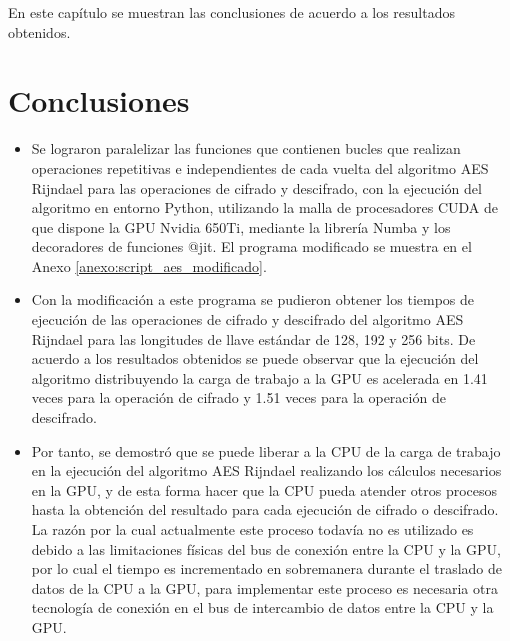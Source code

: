 \documentclass[../main/main.tex]{subfiles}
\begin{document}
\espacio
  En este capítulo se muestran las conclusiones de acuerdo a los resultados obtenidos.

  \section{Conclusiones}

  \begin{itemize}[noitemsep,nolistsep]
    \item Se lograron paralelizar las funciones que contienen bucles que realizan operaciones repetitivas e independientes de cada vuelta del algoritmo AES Rijndael para las operaciones de cifrado y descifrado, con la ejecución del algoritmo en entorno Python, utilizando la malla de procesadores CUDA de que dispone la GPU Nvidia 650Ti, mediante la librería Numba y los decoradores de funciones @jit. El programa modificado se muestra en el Anexo \ref{anexo:script_aes_modificado}.
    \item Con la modificación a este programa se pudieron obtener los tiempos de ejecución de las operaciones de cifrado y descifrado del algoritmo AES Rijndael para las longitudes de llave estándar de 128, 192 y 256 bits. De acuerdo a los resultados obtenidos se puede observar que la ejecución del algoritmo distribuyendo la carga de trabajo a la GPU es acelerada en 1.41 veces para la operación de cifrado y 1.51 veces para la operación de descifrado.
    \item Por tanto, se demostró que se puede liberar a la CPU de la carga de trabajo en la ejecución del algoritmo AES Rijndael realizando los cálculos necesarios en la GPU, y de esta forma hacer que la CPU pueda atender otros procesos hasta la obtención del resultado para cada ejecución de cifrado o descifrado. La razón por la cual actualmente este proceso todavía no es utilizado es debido a las limitaciones físicas del bus de conexión entre la CPU y la GPU, por lo cual el tiempo es incrementado en sobremanera durante el traslado de datos de la CPU a la GPU, para implementar este proceso es necesaria otra tecnología de conexión en el bus de intercambio de datos entre la CPU y la GPU.
  \end{itemize}
\end{document}
